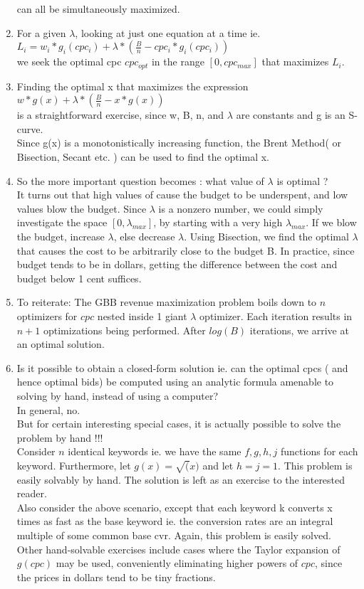 \documentclass{article}
\begin{document}
\begin{enumerate}
can all be simultaneously maximized.

\item
For a given $\lambda$, looking at just one equation at a time ie.\\
$L_i = {w_i*g_i(cpc_i)} + \lambda* (\frac{B}{n} - cpc_i * g_i(cpc_i))$
\\we seek the optimal cpc $cpc_{opt}$ in the range $[0,cpc_{max}]$
that maximizes $L_i$. 

\item Finding the optimal x that maximizes the expression \\
${w*g(x)} + \lambda* (\frac{B}{n} - x * g(x))$ \\
is a straightforward exercise, since w, B, n, and $\lambda$ are constants and g is an S-curve.\\
Since g(x) is a monotonistically increasing function, the Brent Method( or Bisection, Secant etc. ) can be used to find the optimal x.

\item So the more important question becomes : what value of $\lambda$ is optimal ? \\
It turns out that high values of cause the budget to be underspent, and low values blow the budget. Since $\lambda$ is a nonzero number, we could simply investigate the space $[0,\lambda_{max}]$, by starting with a very high $\lambda_{max}$. If we blow the budget, increase $\lambda$, else decrease $\lambda$. Using Bisection, we find the optimal $\lambda$ that causes the cost to be arbitrarily close to the budget B. In practice, since budget tends to be in dollars, getting the difference between the cost and budget below 1 cent suffices.

\item To reiterate: The GBB revenue maximization problem boils down to $n$  optimizers for $cpc$ nested inside 1 giant $\lambda$ optimizer. Each iteration results in $n+1$ optimizations being performed. After $log(B)$ iterations, we arrive at an optimal solution.

\item Is it possible to obtain a closed-form solution ie. can the optimal cpcs ( and hence optimal bids) be computed using an analytic formula amenable to solving by hand, instead of using a computer? \\
In general, no. \\
But for certain interesting special cases, it is actually possible to solve the problem by hand !!!
\\
Consider $n$ identical keywords ie. we have the same $f, g, h, j$ functions for each keyword. Furthermore, let $g(x) = \sqrt(x)$ and let $h = j = 1$. This problem is easily solvably by hand. The solution is left as an exercise to the interested reader.
\\
Also consider the above scenario, except that each keyword k converts x times as fast as the base keyword ie. the conversion rates are an integral multiple of some common base cvr. Again, this problem is easily solved. Other hand-solvable exercises include cases where the Taylor expansion of $g(cpc)$ may be used, conveniently eliminating higher powers of $cpc$, since the prices in dollars tend to be tiny fractions.
\end{enumerate}
\end{document}
